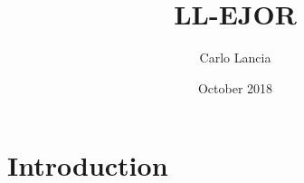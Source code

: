 \documentclass{article}
\title{LL-EJOR}
\author{Carlo Lancia}
\date{October 2018}
\begin{document}
\maketitle

\section{Introduction}
\end{document}
